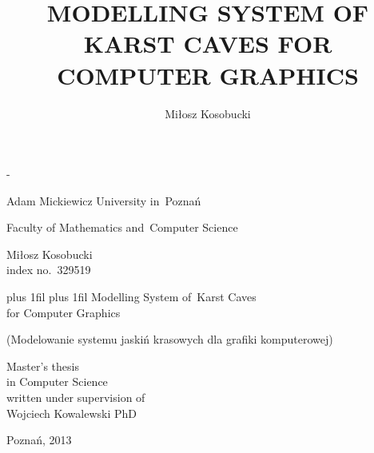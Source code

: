 \documentclass[twoside,openright,a4paper,12pt]{memoir}
\theoremstyle{definition}
\begin{document}
\title{MODELLING SYSTEM OF KARST CAVES FOR COMPUTER GRAPHICS}
\author{Miłosz Kosobucki}


\begin{titlingpage}
\calccentering{\unitlength}
\begin{adjustwidth*}{\unitlength}{-\unitlength}
\begin{center}
  
 \begin{LARGE}
   Adam Mickiewicz University in~Poznań\\
   \begin{Large}
     Faculty of Mathematics and~Computer Science\\
   \end{Large}
   \vspace{1.5cm}
   \begin{huge}
     Miłosz Kosobucki\\
     \small{index no.~329519}\\
   \end{huge}
   \vspace{1.5cm}
   \begin{Huge}
     \leftskip=-3cm plus 1fil\rightskip=-3cm plus 1fil
     Modelling System of~Karst Caves\\ for Computer Graphics\\
   \end{Huge}
   \vspace{0.3cm}
   \begin{footnotesize}
     (Modelowanie systemu jaskiń krasowych dla grafiki komputerowej)
   \end{footnotesize}
   \vspace{1.3cm}
    \begin{flushleft}
      \hsize
      \large
      Master's thesis\\
      in Computer Science\\
      written under supervision of\\
      Wojciech Kowalewski PhD\\
    \end{flushleft}
    \vspace{2.1cm}
    Poznań, 2013
 \end{LARGE}
\end{center}
\end{adjustwidth*}
\end{titlingpage}
\end{document}
